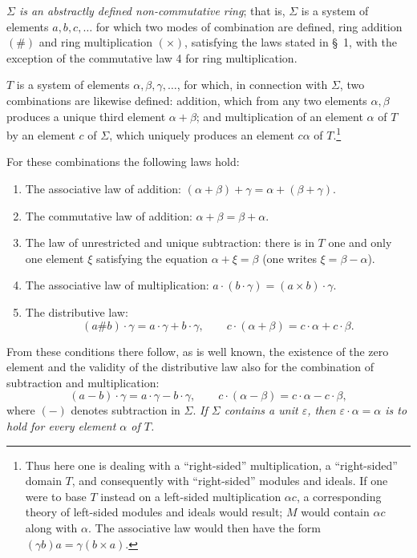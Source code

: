 \documentclass[11pt]{article}
\begin{document}
\emph{$\Sigma$ is an abstractly defined non-commutative ring}; that is, $\Sigma$ is a system of elements $a,b,c,\ldots$ for which two modes of combination are defined, ring addition $(\#)$ and ring multiplication $(\times)$, satisfying the laws stated in \S~1, with the exception of the commutative law 4 for ring multiplication.

$T$ is a system of elements $\alpha,\beta,\gamma,\ldots$, for which, in connection with $\Sigma$, two combinations are likewise defined: addition, which from any two elements $\alpha,\beta$ produces a unique third element $\alpha+\beta$; and multiplication of an element $\alpha$ of $T$ by an element $c$ of $\Sigma$, which uniquely produces an element $c\alpha$ of $T$.\footnote{Thus here one is dealing with a ``right-sided'' multiplication, a ``right-sided'' domain $T$, and consequently with ``right-sided'' modules and ideals. If one were to base $T$ instead on a left-sided multiplication $\alpha c$, a corresponding theory of left-sided modules and ideals would result; $M$ would contain $\alpha c$ along with $\alpha$. The associative law would then have the form $(\gamma b)a=\gamma(b\times a)$.}

For these combinations the following laws hold:
\begin{enumerate}
\item The associative law of addition: $(\alpha+\beta)+\gamma=\alpha+(\beta+\gamma)$.
\item The commutative law of addition: $\alpha+\beta=\beta+\alpha$.
\item The law of unrestricted and unique subtraction: there is in $T$ one and only one element $\xi$ satisfying the equation $\alpha+\xi=\beta$ (one writes $\xi=\beta-\alpha$).
\item The associative law of multiplication: $a\cdot(b\cdot\gamma)=(a\times b)\cdot\gamma$.
\item The distributive law:
\[
 (a\# b)\cdot\gamma=a\cdot\gamma+b\cdot\gamma,\qquad c\cdot(\alpha+\beta)=c\cdot\alpha+c\cdot\beta.
\]
\end{enumerate}
From these conditions there follow, as is well known, the existence of the zero element and the validity of the distributive law also for the combination of subtraction and multiplication:
\[
 (a-b)\cdot\gamma=a\cdot\gamma-b\cdot\gamma,\qquad c\cdot(\alpha-\beta)=c\cdot\alpha-c\cdot\beta,
\]
where $(-)$ denotes subtraction in $\Sigma$. \emph{If $\Sigma$ contains a unit $\varepsilon$, then $\varepsilon\cdot\alpha=\alpha$ is to hold for every element $\alpha$ of $T$.}
\end{document}
